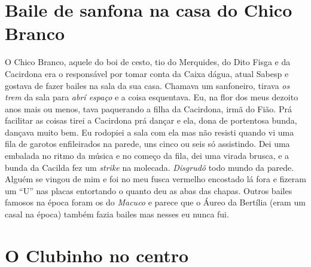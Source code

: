 \documentclass[12pt,brazil,]{book}
\begin{document}
\section{Baile de sanfona na casa do Chico
Branco}\label{baile-de-sanfona-na-casa-do-chico-branco}

O Chico Branco, aquele do boi de cesto, tio do Merquides, do Dito Fisga
e da Cacirdona era o responsável por tomar conta da Caixa dágua, atual
Sabesp e gostava de fazer bailes na sala da sua casa. Chamava um
sanfoneiro, tirava \emph{os trem} da sala para \emph{abrí espaço} e a
coisa esquentava. Eu, na flor dos meus dezoito anos mais ou menos, tava
paquerando a filha da Cacirdona, irmã do Fião. Prá facilitar as coisas
tirei a Cacirdona prá dançar e ela, dona de portentosa bunda, dançava
muito bem. Eu rodopiei a sala com ela mas não resisti quando vi uma fila
de garotos enfileirados na parede, uns cinco ou seis só assistindo. Dei
uma embalada no ritmo da música e no começo da fila, dei uma virada
brusca, e a bunda da Cacilda fez um \emph{strike} na molecada.
\emph{Disgrudô} todo mundo da parede. Alguém se vingou de mim e foi no
meu fusca vermelho encostado lá fora e fizeram um ``U'' nas placas
entortando o quanto deu as abas das chapas. Outros bailes famosos na
época foram os do \emph{Macuco} e parece que o Áureo da Bertília (eram
um casal na época) também fazia bailes mas nesses eu nunca fui.

\section{O Clubinho no centro}\label{o-clubinho-no-centro}
\end{document}
